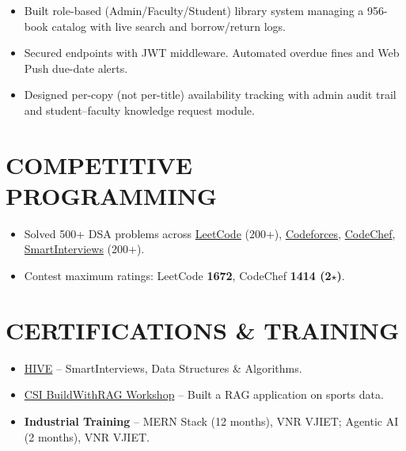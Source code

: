 \documentclass[letterpaper,11pt]{article}
\begin{document}
\begin{itemize}
\item Built role-based (Admin/Faculty/Student) library system managing a 956-book catalog with live search and borrow/return logs.
\item Secured endpoints with JWT middleware. Automated overdue fines and Web Push due-date alerts.
\item Designed per-copy (not per-title) availability tracking with admin audit trail and student--faculty knowledge request module.


\end{itemize}



\section*{COMPETITIVE PROGRAMMING}

\begin{itemize}
\item Solved 500+ DSA problems across \textcolor{blue}{\href{https://leetcode.com/u/rithwiiik007/}{LeetCode}} (200+), \textcolor{blue}{\href{https://codeforces.com/profile/rithwikrr07}{Codeforces}}, \textcolor{blue}{\href{https://www.codechef.com/users/rithwik_07}{CodeChef}}, \textcolor{blue}{\href{https://hive.smartinterviews.in/profile/rithwik2k07}{SmartInterviews}} (200+).
\item Contest maximum ratings: LeetCode \textbf{1672}, CodeChef \textbf{1414 (2$\star$)}.

\end{itemize}

\section*{CERTIFICATIONS \& TRAINING}
\begin{itemize}
\item \textcolor{blue}{\href{https://smartinterviews.in/certificate/1406d39f}{HIVE}} -- SmartInterviews, Data Structures \& Algorithms.


\item \textcolor{blue}{\href{https://drive.google.com/file/d/1VRXnHmmk4D_ZxVTZcymfX-geNMOgyUT2/view?usp=sharing}{CSI BuildWithRAG Workshop}} -- Built a RAG application on sports data.
\item \textbf{Industrial Training} -- MERN Stack (12 months), VNR VJIET; Agentic AI (2 months), VNR VJIET.
\end{itemize}
\end{document}
